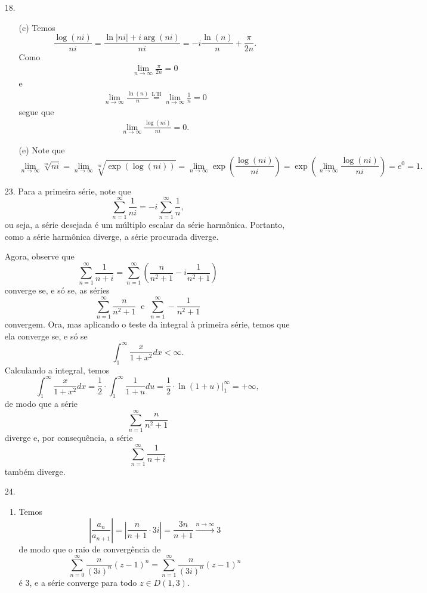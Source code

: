 \documentclass[12pt,a4paper]{article}
\begin{document}
\begin{enumerate}
		\item[18.]
		\begin{enumerate}
			\item[(c)] Temos
			$$
			\frac{\log(ni)}{ni} = \frac{\ln|ni| + i\arg(ni)}{ni} = -i\frac{\ln(n)}{n} + \frac{\pi}{2n}.
			$$
			Como
			\begin{align*}
			\lim\limits_{n\to\infty} \frac{\pi}{2n} = 0 
			\end{align*}
			e
			\begin{align*}
			\lim\limits_{n\to\infty} \frac{\ln(n)}{n} \stackrel{\text{L'H}}{=} \lim\limits_{n\to\infty} \frac{1}{n} = 0
			\end{align*}
			segue que
			\begin{align*}
			\lim\limits_{n\to\infty} \frac{\log(ni)}{ni} = 0. 
			\end{align*}
			
			\item[(e)] Note que
			$$
			\lim\limits_{n\to\infty}\sqrt[ni]{ni} = \lim\limits_{n\to\infty} \sqrt[ni]{\exp\left( \log(ni) \right)} = \lim\limits_{n\to\infty}\exp\left( \frac{\log(ni)}{ni} \right) = \exp\left( \lim\limits_{n\to\infty}\frac{\log(ni)}{ni} \right) = e^0 = 1.
			$$
		\end{enumerate}
		
		\item[23.] Para a primeira série, note que
		$$
		\sum_{n=1}^{\infty}\frac{1}{ni} = -i\sum_{n=1}^{\infty}\frac{1}{n},
		$$
		ou seja, a série desejada é um múltiplo escalar da série harmônica. Portanto, como a série harmônica diverge, a série procurada diverge.
		
		Agora, observe que
		$$
		\sum_{n=1}^{\infty}\frac{1}{n+i} = \sum_{n=1}^{\infty}\left(\frac{n}{n^2+1} - i\frac{1}{n^2+1}\right) 
		$$
		converge se, e só se, as séries
		$$
		\sum_{n=1}^{\infty}\frac{n}{n^2+1} \ \text{ e } \ \sum_{n=1}^{\infty}-\frac{1}{n^2+1}
		$$
		convergem. Ora, mas aplicando o teste da integral à primeira série, temos que ela converge se, e só se
		$$
		\int_{1}^{\infty}\frac{x}{1+x^2}dx < \infty .
		$$
		Calculando a integral, temos
		$$
		\int_{1}^{\infty}\frac{x}{1+x^2}dx = \frac{1}{2}\cdot\int_{1}^{\infty}\frac{1}{1+u}du = \frac{1}{2}\cdot\ln(1+u)\Big|_{1}^{\infty} = +\infty,
		$$
		de modo que a série 
		$$
		\sum_{n=1}^{\infty}\frac{n}{n^2+1}
		$$
		diverge e, por consequência, a série
		$$
		\sum_{n=1}^{\infty}\frac{1}{n+i}
		$$
		também diverge.
		
		\item[24.]
		\begin{enumerate}
			\item Temos
			$$
			\left| \frac{a_n}{a_{n+1}} \right| = \left| \frac{n}{n+1}\cdot 3i \right| = \frac{3n}{n+1} \xrightarrow{n\to\infty} 3
			$$
			de modo que o raio de convergência de 
			$$
			\sum_{n=0}^{\infty}\frac{n}{(3i)^n}(z-1)^n = \sum_{n=1}^{\infty}\frac{n}{(3i)^n}(z-1)^n
			$$
			é $3$, e a série converge para todo $z\in D(1,3)$.
			

\end{enumerate}
\end{enumerate}
\end{document}
